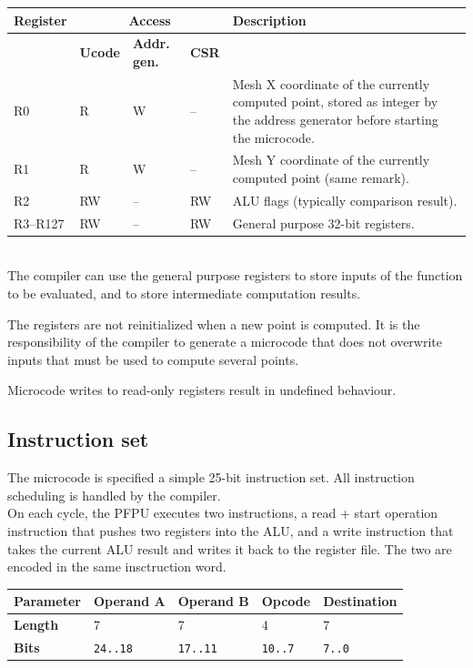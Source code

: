 \documentclass[a4paper,11pt]{article}
\begin{document}
\begin{tabularx}{\textwidth}{|l|l|l|l|X|}
\hline
\bf Register & \multicolumn{3}{|c|}{\bf Access} & \bf Description \\
\hline
 & \bf Ucode & \bf Addr. gen. & \bf CSR & \\
\hline
R0 & R & W & -- & Mesh X coordinate of the currently computed point, stored as integer by the address generator before starting the microcode. \\
\hline
R1 & R & W & -- & Mesh Y coordinate of the currently computed point (same remark). \\
\hline
R2 & RW & -- & RW & ALU flags (typically comparison result). \\
\hline
R3--R127 & RW & -- & RW & General purpose 32-bit registers. \\
\hline
\end{tabularx}\\

The compiler can use the general purpose registers to store inputs of the function to be evaluated, and to store intermediate computation results.

The registers are not reinitialized when a new point is computed. It is the responsibility of the compiler to generate a microcode that does not overwrite inputs that must be used to compute several points.

Microcode writes to read-only registers result in undefined behaviour.

\subsection{Instruction set}
The microcode is specified a simple 25-bit instruction set. All instruction scheduling is handled by the compiler. \\

On each cycle, the PFPU executes two instructions, a read + start operation instruction that pushes two registers into the ALU, and a write instruction that takes the current ALU result and writes it back to the register file. The two are encoded in the same insctruction word. \\

\begin{tabular}{|l|l|l|l|l|}
\hline
\bf Parameter & Operand A & Operand B &  Opcode & Destination \\
\hline
\bf Length & 7 & 7 & 4 & 7 \\
\hline
\bf Bits & \verb!24..18! & \verb!17..11! & \verb!10..7! & \verb!7..0! \\
\hline
\end{tabular}\\
\end{document}
